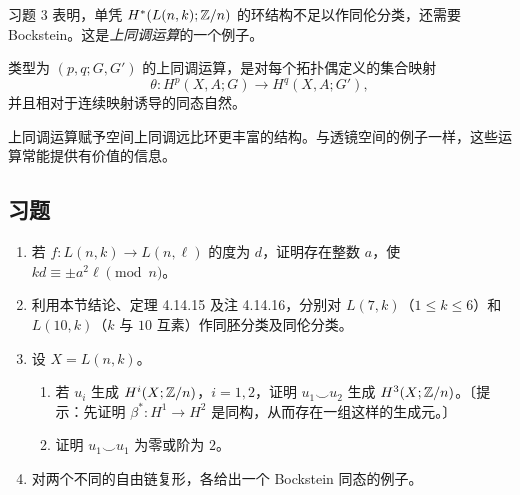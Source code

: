 习题 3 表明，单凭 $H^*(L(n,k);\mathbb{Z}/n)$ 的环结构不足以作同伦分类，还需要 Bockstein。这是\emph{上同调运算}的一个例子。

类型为 $(p,q;G,G')$ 的上同调运算，是对每个拓扑偶定义的集合映射
\[\theta:H^p(X,A;G)\to H^q(X,A;G'),\]
并且相对于连续映射诱导的同态自然。

上同调运算赋予空间上同调远比环更丰富的结构。与透镜空间的例子一样，这些运算常能提供有价值的信息。

\subsection*{习题}
\begin{enumerate}
\item 若 $f:L(n,k)\to L(n,\ell)$ 的度为 $d$，证明存在整数 $a$，使 $kd\equiv\pm a^2\ell\pmod n$。
\item 利用本节结论、定理 4.14.15 及注 4.14.16，分别对 $L(7,k)$（$1\le k\le6$）和 $L(10,k)$（$k$ 与 $10$ 互素）作同胚分类及同伦分类。
\item 设 $X=L(n,k)$。
\begin{enumerate}[label=(\alph*)]
\item 若 $u_i$ 生成 $H^i(X;\mathbb{Z}/n)$，$i=1,2$，证明 $u_1\smile u_2$ 生成 $H^3(X;\mathbb{Z}/n)$。〔提示：先证明 $\beta^*:H^1\to H^2$ 是同构，从而存在一组这样的生成元。〕
\item 证明 $u_1\smile u_1$ 为零或阶为 $2$。
\end{enumerate}
\item 对两个不同的自由链复形，各给出一个 Bockstein 同态的例子。
\end{enumerate}
